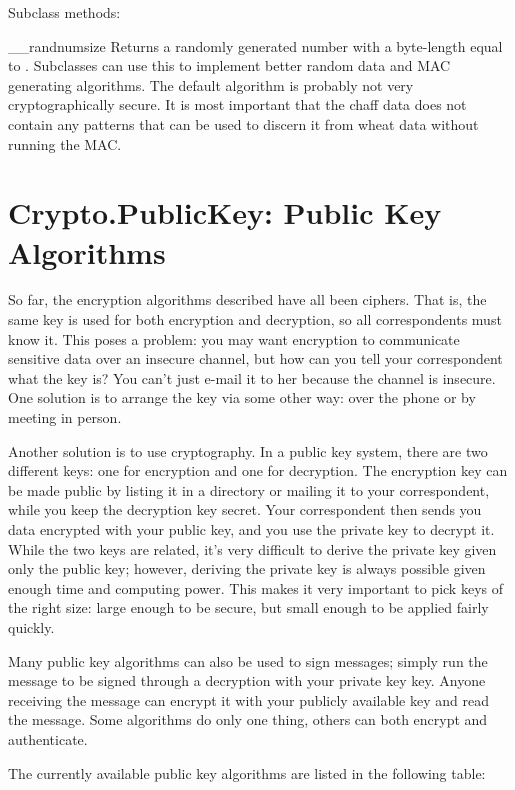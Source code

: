 \documentclass{howto}
\begin{document}
        Subclass methods:

\begin{methoddesc}{__randnum}{size}
Returns a randomly generated number with a byte-length equal
to .  Subclasses can use this to implement better random
data and MAC generating algorithms.  The default algorithm is
probably not very cryptographically secure.  It is most
important that the chaff data does not contain any patterns
that can be used to discern it from wheat data without running 
the MAC.
\end{methoddesc}

\section{Crypto.PublicKey: Public Key Algorithms}
So far, the encryption algorithms described have all been  ciphers.  That is, the same key is used for both encryption and
decryption, so all correspondents must know it.  This poses a problem:
you may want encryption to communicate sensitive data over an insecure
channel, but how can you tell your correspondent what the key is?  You
can't just e-mail it to her because the channel is insecure.  One
solution is to arrange the key via some other way: over the phone or
by meeting in person.

Another solution is to use  cryptography.  In a public
key system, there are two different keys: one for encryption and one for
decryption.  The encryption key can be made public by listing it in a
directory or mailing it to your correspondent, while you keep the
decryption key secret.  Your correspondent then sends you data encrypted
with your public key, and you use the private key to decrypt it.  While
the two keys are related, it's very difficult to derive the private key
given only the public key; however, deriving the private key is always
possible given enough time and computing power.  This makes it very
important to pick keys of the right size: large enough to be secure, but
small enough to be applied fairly quickly.

Many public key algorithms can also be used to sign messages; simply
run the message to be signed through a decryption with your private
key key.  Anyone receiving the message can encrypt it with your
publicly available key and read the message.  Some algorithms do only
one thing, others can both encrypt and authenticate.

The currently available public key algorithms are listed in the
following table:
\end{document}
